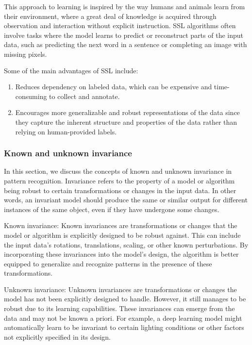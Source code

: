 This approach to learning is inspired by the way humans and animals learn from their environment, where a great deal of knowledge is acquired through observation and interaction without explicit instruction. SSL algorithms often involve tasks where the model learns to predict or reconstruct parts of the input data, such as predicting the next word in a sentence or completing an image with missing pixels.

Some of the main advantages of SSL include:

\begin{enumerate}
\item Reduces dependency on labeled data, which can be expensive and time-consuming to collect and annotate.
\item Encourages more generalizable and robust representations of the data since they capture the inherent structure and properties of the data rather than relying on human-provided labels.
\end{enumerate}

\subsubsection{Known and unknown invariance}

In this section, we discuss the concepts of known and unknown invariance in pattern recognition. Invariance refers to the property of a model or algorithm being robust to certain transformations or changes in the input data. In other words, an invariant model should produce the same or similar output for different instances of the same object, even if they have undergone some changes.

Known invariance: Known invariances are transformations or changes that the model or algorithm is explicitly designed to be robust against. This can include the input data's rotations, translations, scaling, or other known perturbations. By incorporating these invariances into the model's design, the algorithm is better equipped to generalize and recognize patterns in the presence of these transformations.

Unknown invariance: Unknown invariances are transformations or changes the model has not been explicitly designed to handle. However, it still manages to be robust due to its learning capabilities. These invariances can emerge from the data and may not be known a priori. For example, a deep learning model might automatically learn to be invariant to certain lighting conditions or other factors not explicitly specified in its design.

